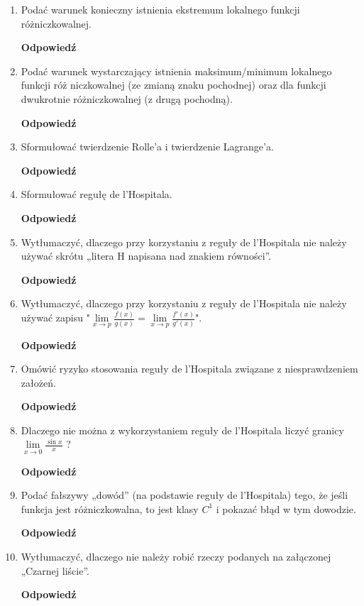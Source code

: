 \documentclass[12pt,a4paper]{article}
\newcounter{twierdzenie}
\theoremstyle{break}
\newcommand{\Odp}[1]{
		\begin{mdframed}[style=zadanie]
			\textbf{Odpowiedź}\\
			#1
		\end{mdframed}
	}
\begin{document}
\begin{enumerate}[1.]
{	}
	
	\item Podać warunek konieczny istnienia ekstremum lokalnego funkcji różniczkowalnej.
	\Odp{
		
	}
	
	\item Podać warunek wystarczający istnienia maksimum/minimum lokalnego funkcji róż	niczkowalnej (ze zmianą znaku pochodnej) oraz dla funkcji dwukrotnie różniczkowalnej (z drugą pochodną).
	\Odp{
	
	}
	
	\item Sformułować twierdzenie Rolle’a i twierdzenie Lagrange’a.
	\Odp{
	
	}
	
	\item Sformułować regułę de l’Hospitala.
	\Odp{
	
	}
	
	\item Wytłumaczyć, dlaczego przy korzystaniu z reguły de l’Hospitala nie należy używać skrótu „litera H napisana nad znakiem równości”.
	\Odp{
	
	}
	
	\item Wytłumaczyć, dlaczego przy korzystaniu z reguły de l’Hospitala nie należy używać zapisu "$\lim\limits_{x\rightarrow p} \frac{f(x)}{g(x)} = \lim\limits_{x\rightarrow p} \frac{f'(x)}{g'(x)}$".
	\Odp{
	
	}
	
	\item Omówić ryzyko stosowania reguły de l’Hospitala związane z niesprawdzeniem założeń.
	\Odp{
	
	}
	
	\item Dlaczego nie można z wykorzystaniem reguły de l’Hospitala liczyć granicy $\lim\limits_{x\rightarrow0}\frac{\sin x}{x}$ ?
	\Odp{
	
	}
	
	\item Podać fałszywy „dowód” (na podstawie reguły de l’Hospitala) tego, że jeśli funkcja jest różniczkowalna, to jest klasy $C^1$ i pokazać błąd w tym dowodzie.
	\Odp{
	
	}
	
	\item Wytłumaczyć, dlaczego nie należy robić rzeczy podanych na załączonej „Czarnej liście”.
	\Odp{
	
	}
	
	\end{enumerate}
	
\end{document}
